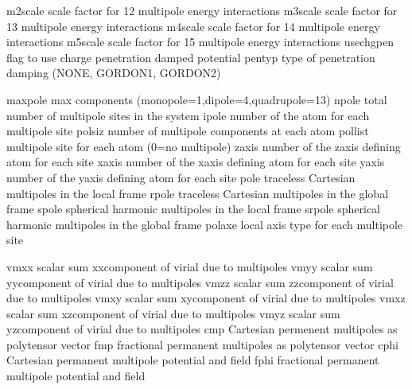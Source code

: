 \documentclass[letterpaper,11pt,english]{sphinxmanual}
\begin{document}

\begin{sphinxVerbatim}[commandchars=\\\{\}]
m2scale         scale factor for 1\PYGZhy{}2 multipole energy interactions
m3scale         scale factor for 1\PYGZhy{}3 multipole energy interactions
m4scale         scale factor for 1\PYGZhy{}4 multipole energy interactions
m5scale         scale factor for 1\PYGZhy{}5 multipole energy interactions
use\PYGZus{}chgpen      flag to use charge penetration damped potential
pentyp          type of penetration damping (NONE, GORDON1, GORDON2)
\end{sphinxVerbatim}


\begin{sphinxVerbatim}[commandchars=\\\{\}]
maxpole         max components (monopole=1,dipole=4,quadrupole=13)
npole           total number of multipole sites in the system
ipole           number of the atom for each multipole site
polsiz          number of multipole components at each atom
pollist         multipole site for each atom (0=no multipole)
zaxis           number of the z\PYGZhy{}axis defining atom for each site
xaxis           number of the x\PYGZhy{}axis defining atom for each site
yaxis           number of the y\PYGZhy{}axis defining atom for each site
pole            traceless Cartesian multipoles in the local frame
rpole           traceless Cartesian multipoles in the global frame
spole           spherical harmonic multipoles in the local frame
srpole          spherical harmonic multipoles in the global frame
polaxe          local axis type for each multipole site
\end{sphinxVerbatim}


\begin{sphinxVerbatim}[commandchars=\\\{\}]
vmxx            scalar sum xx\PYGZhy{}component of virial due to multipoles
vmyy            scalar sum yy\PYGZhy{}component of virial due to multipoles
vmzz            scalar sum zz\PYGZhy{}component of virial due to multipoles
vmxy            scalar sum xy\PYGZhy{}component of virial due to multipoles
vmxz            scalar sum xz\PYGZhy{}component of virial due to multipoles
vmyz            scalar sum yz\PYGZhy{}component of virial due to multipoles
cmp             Cartesian permenent multipoles as polytensor vector
fmp             fractional permanent multipoles as polytensor vector
cphi            Cartesian permanent multipole potential and field
fphi            fractional permanent multipole potential and field
\end{sphinxVerbatim}
\end{document}
